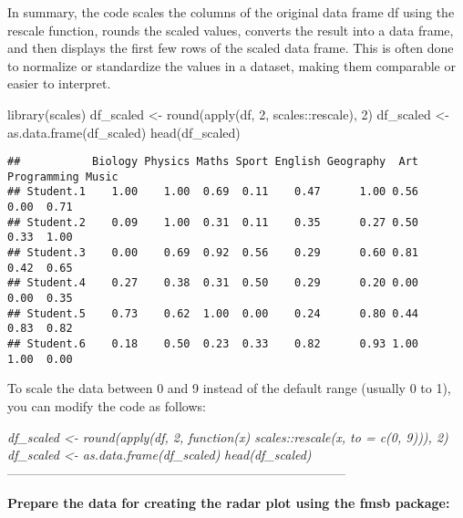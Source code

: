 \documentclass[
]{article}
\newenvironment{Shaded}{\begin{snugshade}}{\end{snugshade}}
\newcommand{\DecValTok}[1]{\textcolor[rgb]{0.00,0.00,0.81}{#1}}
\newcommand{\FunctionTok}[1]{\textcolor[rgb]{0.00,0.00,0.00}{#1}}
\newcommand{\NormalTok}[1]{#1}
\newcommand{\OtherTok}[1]{\textcolor[rgb]{0.56,0.35,0.01}{#1}}
\newcommand{\SpecialCharTok}[1]{\textcolor[rgb]{0.00,0.00,0.00}{#1}}
\begin{document}
In summary, the code scales the columns of the original data frame df
using the rescale function, rounds the scaled values, converts the
result into a data frame, and then displays the first few rows of the
scaled data frame. This is often done to normalize or standardize the
values in a dataset, making them comparable or easier to interpret.

\begin{Shaded}
\begin{Highlighting}[]
\FunctionTok{library}\NormalTok{(scales)}
\NormalTok{df\_scaled }\OtherTok{\textless{}{-}} \FunctionTok{round}\NormalTok{(}\FunctionTok{apply}\NormalTok{(df, }\DecValTok{2}\NormalTok{, scales}\SpecialCharTok{::}\NormalTok{rescale), }\DecValTok{2}\NormalTok{)}
\NormalTok{df\_scaled }\OtherTok{\textless{}{-}} \FunctionTok{as.data.frame}\NormalTok{(df\_scaled)}
\FunctionTok{head}\NormalTok{(df\_scaled)}
\end{Highlighting}
\end{Shaded}

\begin{verbatim}
##           Biology Physics Maths Sport English Geography  Art Programming Music
## Student.1    1.00    1.00  0.69  0.11    0.47      1.00 0.56        0.00  0.71
## Student.2    0.09    1.00  0.31  0.11    0.35      0.27 0.50        0.33  1.00
## Student.3    0.00    0.69  0.92  0.56    0.29      0.60 0.81        0.42  0.65
## Student.4    0.27    0.38  0.31  0.50    0.29      0.20 0.00        0.00  0.35
## Student.5    0.73    0.62  1.00  0.00    0.24      0.80 0.44        0.83  0.82
## Student.6    0.18    0.50  0.23  0.33    0.82      0.93 1.00        1.00  0.00
\end{verbatim}

To scale the data between 0 and 9 instead of the default range (usually
0 to 1), you can modify the code as follows:

\emph{df\_scaled \textless- round(apply(df, 2, function(x)
scales::rescale(x, to = c(0, 9))), 2)} \emph{df\_scaled \textless-
as.data.frame(df\_scaled)} \emph{head(df\_scaled)}
--------------------------------------------------------------------------------

\textbf{Prepare the data for creating the radar plot using the fmsb
package:}
\end{document}
